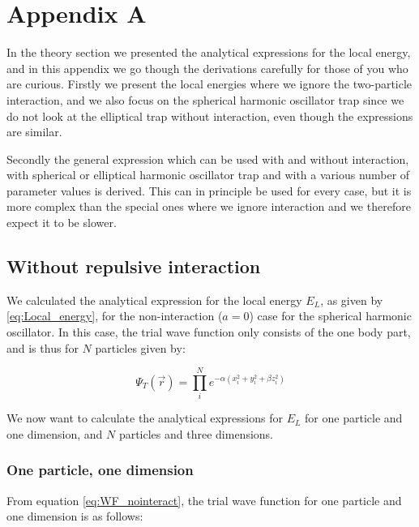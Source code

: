 \documentclass[norsk,a4paper,12pt]{article}
\begin{document}
\newpage

\section*{Appendix A} \label{appendix_A}
In the theory section we presented the analytical expressions for the local energy, and in this appendix we go though the derivations carefully for those of you who are curious. Firstly we present the local energies where we ignore the two-particle interaction, and we also focus on the spherical harmonic oscillator trap since we do not look at the elliptical trap without interaction, even though the expressions are similar.

Secondly the general expression which can be used with and without interaction, with spherical or elliptical harmonic oscillator trap and with a various number of parameter values is derived. This can in principle be used for every case, but it is more complex than the special ones where we ignore interaction and we therefore expect it to be slower. 

\subsection{Without repulsive interaction}
We calculated the analytical expression for the local energy $E_L$, as given by \ref{eq:Local_energy}, for the non-interaction ($a=0$) case for the spherical harmonic oscillator. In this case, the trial wave function only consists of the one body part, and is thus for $N$ particles given by:

\begin{equation}
	\label{eq:WF_nointeract}
	\Psi_T(\vec{r}) = \prod_i^N e^{-\alpha(x_i^2 + y_i^2 + \beta z_i^2)}
\end{equation}

We now want to calculate the analytical expressions for $E_L$ for one particle and one dimension, and $N$ particles and three dimensions.

\subsubsection{One particle, one dimension}

From equation \ref{eq:WF_nointeract}, the trial wave function for one particle and one dimension is as follows:
\end{document}
